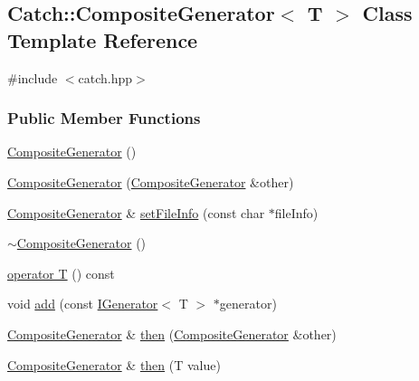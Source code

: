 \hypertarget{classCatch_1_1CompositeGenerator}{\subsection{Catch\-:\-:Composite\-Generator$<$ T $>$ Class Template Reference}
\label{classCatch_1_1CompositeGenerator}
}


{\ttfamily \#include $<$catch.\-hpp$>$}

\subsubsection*{Public Member Functions}
\begin{DoxyCompactItemize}
\item 
\hyperlink{classCatch_1_1CompositeGenerator_a923398b140371d1783858766864a1af5}{Composite\-Generator} ()
\item 
\hyperlink{classCatch_1_1CompositeGenerator_a21a7070a00e4a6fe021294c356692692}{Composite\-Generator} (\hyperlink{classCatch_1_1CompositeGenerator}{Composite\-Generator} \&other)
\item 
\hyperlink{classCatch_1_1CompositeGenerator}{Composite\-Generator} \& \hyperlink{classCatch_1_1CompositeGenerator_ac3c57cf4ca5472f440bf71e2936bcd4a}{set\-File\-Info} (const char $\ast$file\-Info)
\item 
\hyperlink{classCatch_1_1CompositeGenerator_a5766205abd7004c508c20ddbb5e5555e}{$\sim$\-Composite\-Generator} ()
\item 
\hyperlink{classCatch_1_1CompositeGenerator_aa3f627d84fb256df0404d19d7fd4b784}{operator T} () const 
\item 
void \hyperlink{classCatch_1_1CompositeGenerator_af3774d42ad2d3453d089ca599efe0517}{add} (const \hyperlink{structCatch_1_1IGenerator}{I\-Generator}$<$ T $>$ $\ast$generator)
\item 
\hyperlink{classCatch_1_1CompositeGenerator}{Composite\-Generator} \& \hyperlink{classCatch_1_1CompositeGenerator_a2e03f42df85cdd238aabd77a80b075d5}{then} (\hyperlink{classCatch_1_1CompositeGenerator}{Composite\-Generator} \&other)
\item 
\hyperlink{classCatch_1_1CompositeGenerator}{Composite\-Generator} \& \hyperlink{classCatch_1_1CompositeGenerator_aefdc11bcfccdf07d2db5f0da3ed8758c}{then} (T value)
\end{DoxyCompactItemize}


